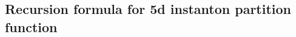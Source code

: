 \documentclass[letterpaper, 11pt]{article}
\def\IC{\mathbb{C}}
\def\e{\epsilon}
\def\k{\kappa}
\begin{document}

\subsection{Recursion formula for 5d instanton partition function}
\label{subsec:recursion}
\end{document}
